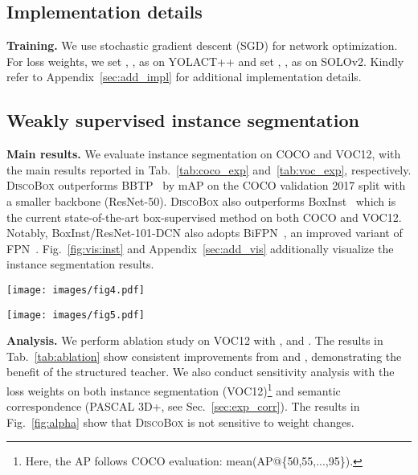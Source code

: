 \subsection{Implementation details} \label{sec:exp_impl}

\textbf{Training.} We use stochastic gradient descent (SGD) for network optimization. For loss weights, we set , ,   as  on YOLACT++ and set , ,  as  on SOLOv2. Kindly refer to Appendix~\ref{sec:add_impl} for additional implementation details.

\subsection{Weakly supervised instance segmentation} \label{sec:wssc}

\textbf{Main results.} We evaluate instance segmentation on COCO and VOC12, with the main results reported in Tab.~\ref{tab:coco_exp} and~\ref{tab:voc_exp}, respectively. \textsc{DiscoBox} outperforms BBTP~\cite{hsu2019weakly} by  mAP on the COCO validation 2017 split with a smaller backbone (ResNet-50). \textsc{DiscoBox} also outperforms BoxInst~\cite{tian2021boxinst} which is the current state-of-the-art box-supervised method on both COCO and VOC12. Notably, BoxInst/ResNet-101-DCN also adopts BiFPN~\cite{tan2020efficientdet}, an improved variant of FPN~\cite{lin2017feature}. Fig.~\ref{fig:vis:inst} and Appendix~\ref{sec:add_vis} additionally visualize the instance segmentation results.

\begin{figure*}[t]
\centering
\texttt{[image: images/fig4.pdf]}\\
\caption{Visualization of instance segmentation on COCO (YOLACT++/ResNet-50-DCN).}
\label{fig:vis:inst}
\vspace{-0.15cm}
\end{figure*}

\begin{figure*}[t]
\centering
\texttt{[image: images/fig5.pdf]}
\caption{Visualization of multi-object semantic correspondence on PASCAL 3D+ (YOLACT++/ResNet-50-DCN).}
\label{fig:vis:corr}
\end{figure*}

\textbf{Analysis.} We perform ablation study on VOC12 with ,  and . The results in Tab.~\ref{tab:ablation} show consistent improvements from  and , demonstrating the benefit of the structured teacher. We also conduct sensitivity analysis with the loss weights on both instance segmentation (VOC12)\footnote{Here, the AP follows COCO evaluation: mean(AP@\{50,55,...,95\}).}
and semantic correspondence (PASCAL 3D+, see Sec.~\ref{sec:exp_corr}). The results in Fig.~\ref{fig:alpha} show that \textsc{DiscoBox} is not sensitive to weight changes.

